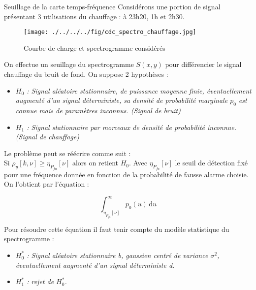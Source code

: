\documentclass{beamer}
\begin{document}
\begin{frame}{Seuillage de la carte temps-fréquence}
Considérons une portion de signal présentant 3 utilisations du chauffage : à 23h20, 1h et 2h30.
\begin{figure}[!h]
\begin{center}
\texttt{[image: ./../../../fig/cdc\_spectro\_chauffage.jpg]}
\caption{Courbe de charge et spectrogramme considérés}
\label{Figure8}
\end{center}
\end{figure}
\end{frame}

\begin{frame}
On effectue un seuillage du spectrogramme $S(x,y)$ pour différencier le signal chauffage du bruit de fond. On suppose 2 hypothèses :
\begin{itemize}
	\item \textit{$H_0$ : Signal aléatoire stationnaire, de puissance moyenne finie, éventuellement augmenté d'un signal déterministe, sa densité de probabilité marginale $p_0$ est connue mais de paramètres inconnus. (Signal de bruit)}
	\item \textit{$H_1$ : Signal stationnaire par morceaux de densité de probabilité inconnue. (Signal de chauffage)}
\end{itemize}
\end{frame}

\begin{frame}
Le problème peut se réécrire comme suit : \\
Si $\rho_y[k,\nu] \ge \eta_{P_{fa}}[\nu]$ alors on retient $H_0$.
Avec $\eta_{P_{fa}}[\nu]$ le seuil de détection fixé pour une fréquence donnée en fonction de la probabilité de fausse alarme choisie. \\
On l'obtient par l'équation :

\begin{equation}
\int_{\eta_{P_{fa}}[\nu]}^\infty p_0(u)\, \mathrm du
\label{eq1}
\end{equation}

Pour résoudre cette équation il faut tenir compte du modèle statistique du spectrogramme :
\begin{itemize}
	\item \textit{$H_0^*$ : Signal aléatoire stationnaire b, gaussien centré de variance $\sigma^2$, éventuellement augmenté d'un signal déterministe d.}
	\item \textit{$H_1^*$ : rejet de $H_0^*$.}
\end{itemize}
\end{frame}
\end{document}

